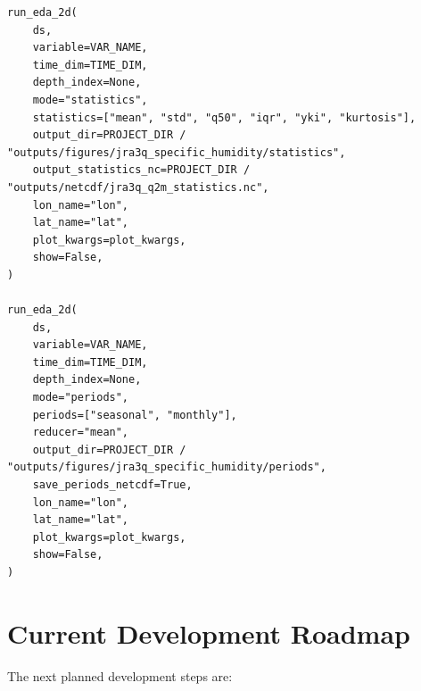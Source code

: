 \documentclass[11pt,a4paper]{article}
\begin{document}
\begin{lstlisting}[style=pythonstyle]
run_eda_2d(
    ds,
    variable=VAR_NAME,
    time_dim=TIME_DIM,
    depth_index=None,
    mode="statistics",
    statistics=["mean", "std", "q50", "iqr", "yki", "kurtosis"],
    output_dir=PROJECT_DIR / "outputs/figures/jra3q_specific_humidity/statistics",
    output_statistics_nc=PROJECT_DIR / "outputs/netcdf/jra3q_q2m_statistics.nc",
    lon_name="lon",
    lat_name="lat",
    plot_kwargs=plot_kwargs,
    show=False,
)

run_eda_2d(
    ds,
    variable=VAR_NAME,
    time_dim=TIME_DIM,
    depth_index=None,
    mode="periods",
    periods=["seasonal", "monthly"],
    reducer="mean",
    output_dir=PROJECT_DIR / "outputs/figures/jra3q_specific_humidity/periods",
    save_periods_netcdf=True,
    lon_name="lon",
    lat_name="lat",
    plot_kwargs=plot_kwargs,
    show=False,
)
\end{lstlisting}

\section{Current Development Roadmap}

The next planned development steps are:
\end{document}
